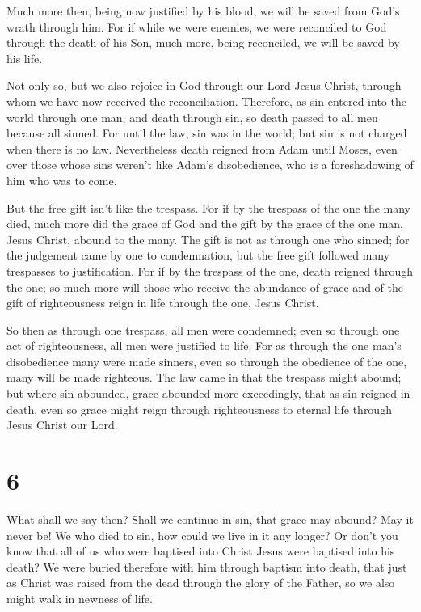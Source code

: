  Much more then, being now justified by his blood, we will
be saved from God's wrath through him.  For if while we
were enemies, we were reconciled to God through the death of his Son,
much more, being reconciled, we will be saved by his life.

 Not only so, but we also rejoice in God through our Lord
Jesus Christ, through whom we have now received the reconciliation.
 Therefore, as sin entered into the world through one man,
and death through sin, so death passed to all men because all sinned.
 For until the law, sin was in the world; but sin is not
charged when there is no law.  Nevertheless death reigned
from Adam until Moses, even over those whose sins weren't like Adam's
disobedience, who is a foreshadowing of him who was to come.

 But the free gift isn't like the trespass. For if by the
trespass of the one the many died, much more did the grace of God and
the gift by the grace of the one man, Jesus Christ, abound to the many.
 The gift is not as through one who sinned; for the
judgement came by one to condemnation, but the free gift followed many
trespasses to justification.  For if by the trespass of the
one, death reigned through the one; so much more will those who receive
the abundance of grace and of the gift of righteousness reign in life
through the one, Jesus Christ.

 So then as through one trespass, all men were condemned;
even so through one act of righteousness, all men were justified to
life.  For as through the one man's disobedience many were
made sinners, even so through the obedience of the one, many will be
made righteous.  The law came in that the trespass might
abound; but where sin abounded, grace abounded more exceedingly,
 that as sin reigned in death, even so grace might reign
through righteousness to eternal life through Jesus Christ our Lord.

\hypertarget{section-5}{%
\section{6}\label{section-5}}

 What shall we say then? Shall we continue in sin, that
grace may abound?  May it never be! We who died to sin, how
could we live in it any longer?  Or don't you know that all
of us who were baptised into Christ Jesus were baptised into his death?
 We were buried therefore with him through baptism into
death, that just as Christ was raised from the dead through the glory of
the Father, so we also might walk in newness of life.

